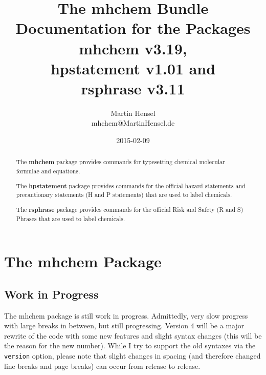 \documentclass[a4paper,notitlepage]{scrreprt}
\newenvironment{annotation}{\bgroup\footnotesize}{\par\egroup}
\begin{document}
\title{%
  The mhchem Bundle\\[0.3em]
  \Large\textmd{%
    Documentation for the Packages\\
    mhchem v3.19,\\%
    hpstatement v1.01 and\\
    rsphrase v3.11}%
}
\author{%
  Martin Hensel\\
  mhchem\makebox[0pt][l]{\textcolor{white}{NOSPAM}}@MartinHensel\makebox[1pt][l]{\textcolor{white}{.}}.de%
}
\date{%
  2015-02-09%
}
\maketitle

\vfill

\begin{abstract}
  \noindent
  The \textbf{mhchem} package provides commands for typesetting chemical molecular formulae and equations.
  \medskip
  
  \noindent The \textbf{hpstatement} package provides commands for the official hazard statements and precautionary statements (H and P statements) that are used to label chemicals.
  \medskip

  \noindent
  The \textbf{rsphrase} package provides commands for the official Risk and Safety (R and S) Phrases that are used to label chemicals.
\end{abstract}



\clearpage
\tableofcontents



\clearpage

\chapter{The mhchem Package}

\section{Work in Progress}

\begin{annotation}
The mhchem package is still work in progress. Admittedly, very slow progress with large breaks in between, but still progressing. Version 4 will be a major rewrite of the code with some new features and slight syntax changes (this will be the reason for the new number). While I try to support the old syntaxes via the \verb|version| option, please note that slight changes in spacing (and therefore changed line breaks and page breaks) can occur from release to release.
\end{annotation}
\end{document}
